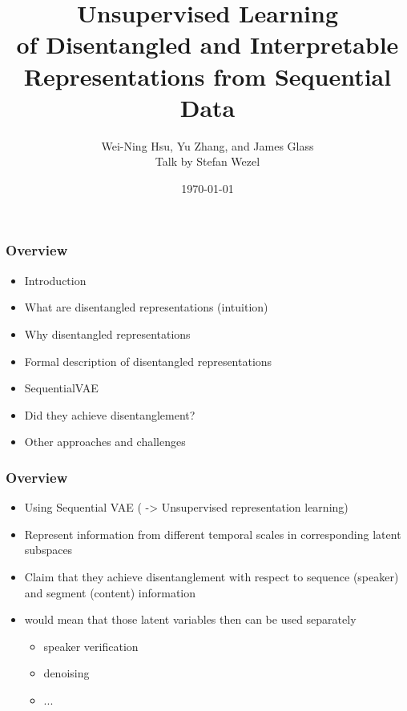 \documentclass[9pt]{beamer}
\title{Unsupervised Learning \\
	of Disentangled and Interpretable Representations from Sequential Data}
\author{Wei-Ning Hsu, Yu Zhang, and James Glass\\Talk by Stefan Wezel}
\institute{Explainable Machine Learning}
\date{\today}
\begin{document}
	

\begin{frame}[plain]
	\titlepage
\end{frame} 



\begin{frame}
\frametitle{Overview}
\begin{itemize}%
	\item Introduction
	\item What are disentangled representations (intuition)
	\item Why disentangled representations
	\item Formal description of disentangled representations
	\item SequentialVAE
	\item Did they achieve disentanglement?
	\item Other approaches and challenges
\end{itemize}
\end{frame} 



\begin{frame}
\frametitle{Overview}
\begin{itemize}%
	\item Using Sequential VAE ( -> Unsupervised representation learning)
	\item Represent information from different temporal scales in corresponding latent subspaces
	\item Claim that they achieve disentanglement with respect to sequence (speaker) and segment (content) information
	\item would mean that those latent variables then can be used separately
	\begin{itemize}
		\item speaker verification
		\item denoising
		\item ...
	\end{itemize}
\end{itemize}
\end{frame} 
\end{document}
